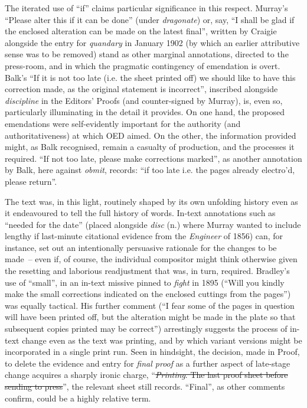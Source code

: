 \documentclass[output=paper,colorlinks,citecolor=brown,arabicfont,chinesefont]{langscibook}
\begin{document}
The iterated use of “if” claims particular significance in this respect. Murray’s “Please alter this if it can be done” (under \emph{dragonate}) or, say, “I shall be glad if the enclosed alteration can be made on the latest final”, written by Craigie alongside the entry for \emph{quandary} in January 1902  (by which an earlier attributive sense was to be removed) stand as other marginal annotations, directed to the press-room, and in which the pragmatic contingency of emendation is overt. Balk’s “If it is not too late (i.e. the sheet printed off) we should like to have this correction made, as the original statement is incorrect”, inscribed alongside \emph{discipline} in the Editors’ Proofs (and counter-signed by Murray), is, even so, particularly illuminating in the detail it provides. On one hand, the proposed emendations were self-evidently important for the authority (and authoritativeness) at which OED aimed. On the other, the information provided might, as Balk recognised, remain a casualty of production, and the processes it required. “If not too late, please make corrections marked”, as another annotation by Balk, here against \emph{obmit}, records: “if too late i.e. the pages already electro’d, please return”.

The text was, in this light, routinely shaped by its own unfolding history even as it endeavoured to tell the full history of words. In-text annotations such as “needed for the date” (placed alongside \emph{disc} (n.) where Murray wanted to include lengthy if last-minute citational evidence from the \emph{Engineer} of 1856) can, for instance, set out an intentionally persuasive rationale for the changes to be made~-- even if, of course, the individual compositor might think otherwise given the resetting and laborious readjustment that was, in turn, required. Bradley’s use of “small”, in an in-text missive pinned to \emph{fight} in 1895 (“Will you kindly make the small corrections indicated on the enclosed cuttings from the pages”) was equally tactical. His further comment (“I fear some of the pages in question will have been printed off, but the alteration might be made in the plate so that subsequent copies printed may be correct”) arrestingly suggests the process of in-text change even as the text was printing, and by which variant versions might be incorporated in a single print run. Seen in hindsight, the decision, made in Proof, to delete the evidence and entry for \emph{final proof} as a further aspect of late-stage change acquires a sharply ironic charge, “\sout{\emph{Printing}. The last proof sheet before sending to press}”, the relevant sheet still records. “Final”, as other comments confirm, could be a highly relative term.  
\end{document}
